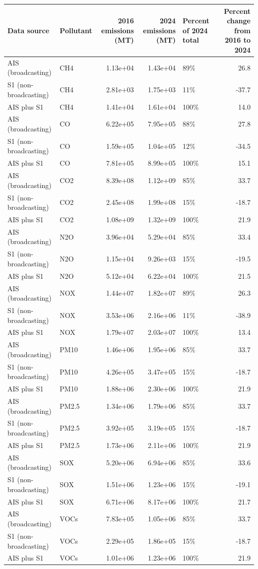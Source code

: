 
\begin{tabular}{l|l|r|r|l|r}
\hline
Data source & Pollutant & 2016 emissions (MT) & 2024 emissions (MT) & Percent of 2024 total & Percent change from 2016 to 2024\\
\hline
AIS (broadcasting) & CH4 & 1.13e+04 & 1.43e+04 & 89\% & 26.8\\
\hline
S1 (non-broadcasting) & CH4 & 2.81e+03 & 1.75e+03 & 11\% & -37.7\\
\hline
AIS plus S1 & CH4 & 1.41e+04 & 1.61e+04 & 100\% & 14.0\\
\hline
AIS (broadcasting) & CO & 6.22e+05 & 7.95e+05 & 88\% & 27.8\\
\hline
S1 (non-broadcasting) & CO & 1.59e+05 & 1.04e+05 & 12\% & -34.5\\
\hline
AIS plus S1 & CO & 7.81e+05 & 8.99e+05 & 100\% & 15.1\\
\hline
AIS (broadcasting) & CO2 & 8.39e+08 & 1.12e+09 & 85\% & 33.7\\
\hline
S1 (non-broadcasting) & CO2 & 2.45e+08 & 1.99e+08 & 15\% & -18.7\\
\hline
AIS plus S1 & CO2 & 1.08e+09 & 1.32e+09 & 100\% & 21.9\\
\hline
AIS (broadcasting) & N2O & 3.96e+04 & 5.29e+04 & 85\% & 33.4\\
\hline
S1 (non-broadcasting) & N2O & 1.15e+04 & 9.26e+03 & 15\% & -19.5\\
\hline
AIS plus S1 & N2O & 5.12e+04 & 6.22e+04 & 100\% & 21.5\\
\hline
AIS (broadcasting) & NOX & 1.44e+07 & 1.82e+07 & 89\% & 26.3\\
\hline
S1 (non-broadcasting) & NOX & 3.53e+06 & 2.16e+06 & 11\% & -38.9\\
\hline
AIS plus S1 & NOX & 1.79e+07 & 2.03e+07 & 100\% & 13.4\\
\hline
AIS (broadcasting) & PM10 & 1.46e+06 & 1.95e+06 & 85\% & 33.7\\
\hline
S1 (non-broadcasting) & PM10 & 4.26e+05 & 3.47e+05 & 15\% & -18.7\\
\hline
AIS plus S1 & PM10 & 1.88e+06 & 2.30e+06 & 100\% & 21.9\\
\hline
AIS (broadcasting) & PM2.5 & 1.34e+06 & 1.79e+06 & 85\% & 33.7\\
\hline
S1 (non-broadcasting) & PM2.5 & 3.92e+05 & 3.19e+05 & 15\% & -18.7\\
\hline
AIS plus S1 & PM2.5 & 1.73e+06 & 2.11e+06 & 100\% & 21.9\\
\hline
AIS (broadcasting) & SOX & 5.20e+06 & 6.94e+06 & 85\% & 33.6\\
\hline
S1 (non-broadcasting) & SOX & 1.51e+06 & 1.23e+06 & 15\% & -19.1\\
\hline
AIS plus S1 & SOX & 6.71e+06 & 8.17e+06 & 100\% & 21.7\\
\hline
AIS (broadcasting) & VOCs & 7.83e+05 & 1.05e+06 & 85\% & 33.7\\
\hline
S1 (non-broadcasting) & VOCs & 2.29e+05 & 1.86e+05 & 15\% & -18.7\\
\hline
AIS plus S1 & VOCs & 1.01e+06 & 1.23e+06 & 100\% & 21.9\\
\hline
\end{tabular}
